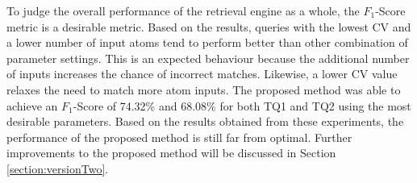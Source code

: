 To judge the overall performance of the retrieval engine as a whole, the $F_1$-Score metric is a desirable metric. %
Based on the results, queries with the lowest CV and a lower number of input atoms tend to perform better than other combination of parameter settings.
This is an expected behaviour because the additional number of inputs increases the chance of incorrect matches. Likewise, a lower CV value relaxes the need to match more atom
inputs.
The proposed method was able to achieve an $F_1$-Score of 74.32\% and 68.08\% for both TQ1 and TQ2 using the most desirable parameters. Based on the results obtained from these experiments, the performance of the proposed method is still far from optimal. %
Further improvements to the proposed method will be discussed in Section \ref{section:versionTwo}.

